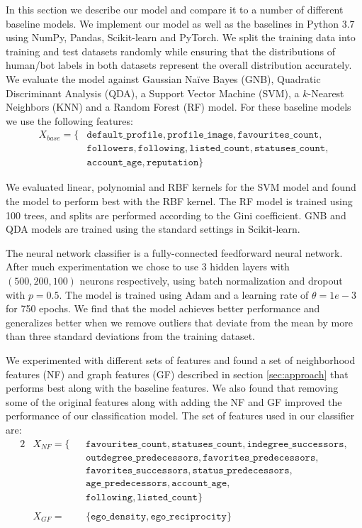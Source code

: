 In this section we describe our model and compare it to a number of different baseline models. We implement our model as well as the baselines in Python 3.7 using NumPy, Pandas, Scikit-learn and PyTorch. We split the training data into training and test datasets randomly while ensuring that the distributions of human/bot labels in both datasets represent the overall distribution accurately. 
We evaluate the model against Gaussian Naïve Bayes (GNB), Quadratic Discriminant Analysis (QDA), a Support Vector Machine (SVM), a $k$-Nearest Neighbors (KNN) and a Random Forest (RF) model. For these baseline models we use the following features:
\begin{align*}
    X_{base} = \{ & \texttt{default\_profile}, \texttt{profile\_image}, \texttt{favourites\_count}, \\
    & \texttt{followers}, \texttt{following}, \texttt{listed\_count}, \texttt{statuses\_count}, \\
    & \texttt{account\_age}, \texttt{reputation} \}
\end{align*}

We evaluated linear, polynomial and RBF kernels for the SVM model and found the model to perform best with the RBF kernel. The RF model is trained using 100 trees, and splits are performed according to the Gini coefficient. GNB and QDA models are trained using the standard settings in Scikit-learn. 

The neural network classifier is a fully-connected feedforward neural network. After much experimentation we chose to use 3 hidden layers with $(500, 200, 100)$ neurons respectively, using batch normalization and dropout with $p=0.5$. The model is trained using Adam and a learning rate of $\theta = 1e-3$ for 750 epochs. We find that the model achieves better performance and generalizes better when we remove outliers that deviate from the mean by more than three standard deviations from the training dataset.

We experimented with different sets of features and found a set of neighborhood features (NF) and graph features (GF) described in section \ref{sec:approach} that performs best along with the baseline features. We also found that removing some of the original features along with adding the  NF and GF improved the performance of our classification model. The set of features used in our classifier are:
\begin{alignat*}{2}
    & X_{NF} = \{ && \texttt{favourites\_count}, \texttt{statuses\_count}, \texttt{indegree\_successors}, \\
    & && \texttt{outdegree\_predecessors}, \texttt{favorites\_predecessors}, \\
    & && \texttt{favorites\_successors}, \texttt{status\_predecessors}, \\
    & && \texttt{age\_predecessors}, \texttt{account\_age}, \\
    & && \texttt{following}, \texttt{listed\_count} \} \\
    \\
    & X_{GF} = && \{ \texttt{ego\_density}, \texttt{ego\_reciprocity} \}
\end{alignat*}

